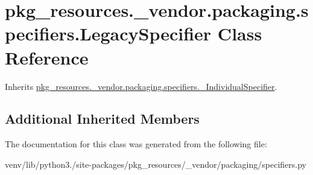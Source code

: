 \hypertarget{classpkg__resources_1_1__vendor_1_1packaging_1_1specifiers_1_1_legacy_specifier}{}\section{pkg\+\_\+resources.\+\_\+vendor.\+packaging.\+specifiers.\+Legacy\+Specifier Class Reference}
\label{classpkg__resources_1_1__vendor_1_1packaging_1_1specifiers_1_1_legacy_specifier}


Inherits \hyperlink{classpkg__resources_1_1__vendor_1_1packaging_1_1specifiers_1_1___individual_specifier}{pkg\+\_\+resources.\+\_\+vendor.\+packaging.\+specifiers.\+\_\+\+Individual\+Specifier}.

\subsection*{Additional Inherited Members}


The documentation for this class was generated from the following file\+:\begin{DoxyCompactItemize}
\item 
venv/lib/python3./site-\/packages/pkg\+\_\+resources/\+\_\+vendor/packaging/specifiers.\+py\end{DoxyCompactItemize}
